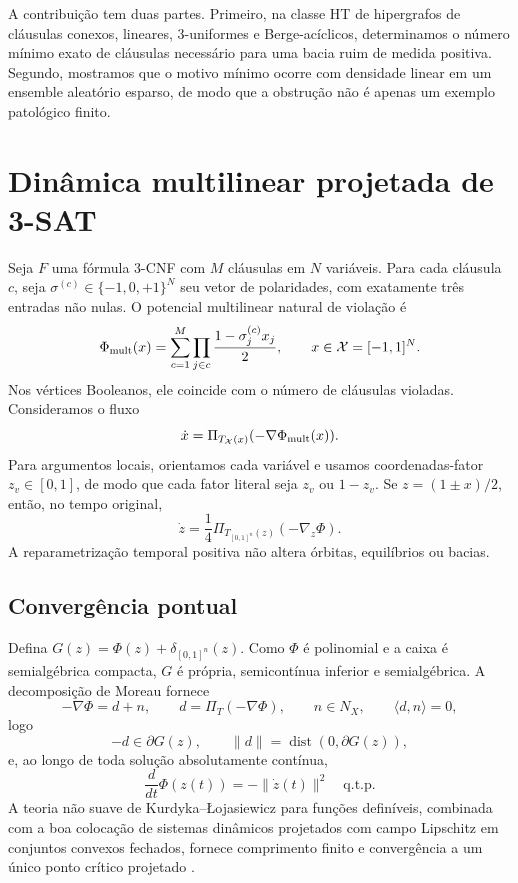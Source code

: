 \documentclass[11pt,a4paper]{article}
\newcommand{\X}{\mathcal X}
\begin{document}
A contribuição tem duas partes. Primeiro, na classe HT de hipergrafos de cláusulas conexos, lineares, 3-uniformes e Berge-acíclicos, determinamos o número mínimo exato de cláusulas necessário para uma bacia ruim de medida positiva. Segundo, mostramos que o motivo mínimo ocorre com densidade linear em um ensemble aleatório esparso, de modo que a obstrução não é apenas um exemplo patológico finito.

\section{Dinâmica multilinear projetada de 3-SAT}
Seja $F$ uma fórmula 3-CNF com $M$ cláusulas em $N$ variáveis. Para cada cláusula $c$, seja $\sigma^{(c)}\in\{-1,0,+1\}^N$ seu vetor de polaridades, com exatamente três entradas não nulas. O potencial multilinear natural de violação é
\begin{equation}
\Phi_{\rm mult}(x)=\sum_{c=1}^M\prod_{j\in c}\frac{1-\sigma_j^{(c)}x_j}{2},\qquad x\in\X=[-1,1]^N.
\end{equation}
Nos vértices Booleanos, ele coincide com o número de cláusulas violadas. Consideramos o fluxo
\begin{equation}
\dot x=\Pi_{T_\X(x)}(-\nabla\Phi_{\rm mult}(x)).
\end{equation}
Para argumentos locais, orientamos cada variável e usamos coordenadas-fator $z_v\in[0,1]$, de modo que cada fator literal seja $z_v$ ou $1-z_v$. Se $z=(1\pm x)/2$, então, no tempo original,
\begin{equation}
\dot z=\frac14\Pi_{T_{[0,1]^n}(z)}(-\nabla_z\Phi).
\end{equation}
A reparametrização temporal positiva não altera órbitas, equilíbrios ou bacias.

\subsection{Convergência pontual}
Defina $G(z)=\Phi(z)+\delta_{[0,1]^n}(z)$. Como $\Phi$ é polinomial e a caixa é semialgébrica compacta, $G$ é própria, semicontínua inferior e semialgébrica. A decomposição de Moreau fornece
\[
-\nabla\Phi=d+n,\qquad d=\Pi_T(-\nabla\Phi),\qquad n\in N_X,\qquad \langle d,n\rangle=0,
\]
logo
\[
-d\in\partial G(z),\qquad \|d\|=\operatorname{dist}(0,\partial G(z)),
\]
e, ao longo de toda solução absolutamente contínua,
\begin{equation}
\frac{d}{dt}\Phi(z(t))=-\|\dot z(t)\|^2\quad\text{q.t.p.}
\end{equation}
A teoria não suave de Kurdyka--\L{}ojasiewicz para funções definíveis, combinada com a boa colocação de sistemas dinâmicos projetados com campo Lipschitz em conjuntos convexos fechados, fornece comprimento finito e convergência a um único ponto crítico projetado \cite{BDL,BDLS,Brogliato,Nagurney}.
\end{document}

